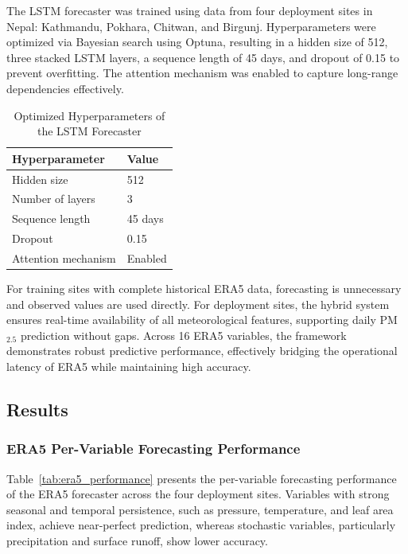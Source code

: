\documentclass[12pt]{report}
\begin{document}
The LSTM forecaster was trained using data from four deployment sites in Nepal: Kathmandu, Pokhara, Chitwan, and Birgunj. Hyperparameters were optimized via Bayesian search using Optuna, resulting in a hidden size of 512, three stacked LSTM layers, a sequence length of 45 days, and dropout of 0.15 to prevent overfitting. The attention mechanism was enabled to capture long-range dependencies effectively.

\begin{table}[H]
\centering
\caption{Optimized Hyperparameters of the LSTM Forecaster}
\vspace{.5cm}
\begin{tabular}{|l|l|}
\hline
\textbf{Hyperparameter} & \textbf{Value} \\
\hline
Hidden size & 512 \\
\hline
Number of layers & 3 \\
\hline
Sequence length & 45 days \\
\hline
Dropout & 0.15 \\
\hline
Attention mechanism & Enabled \\
\hline
\end{tabular}
\end{table}

For training sites with complete historical ERA5 data, forecasting is unnecessary and observed values are used directly. For deployment sites, the hybrid system ensures real-time availability of all meteorological features, supporting daily PM$_{2.5}$ prediction without gaps. Across 16 ERA5 variables, the framework demonstrates robust predictive performance, effectively bridging the operational latency of ERA5 while maintaining high accuracy.
\subsection{Results}

\subsubsection{ERA5 Per-Variable Forecasting Performance}

Table~\ref{tab:era5_performance} presents the per-variable forecasting performance of the ERA5 forecaster across the four deployment sites. Variables with strong seasonal and temporal persistence, such as pressure, temperature, and leaf area index, achieve near-perfect prediction, whereas stochastic variables, particularly precipitation and surface runoff, show lower accuracy.
\end{document}
